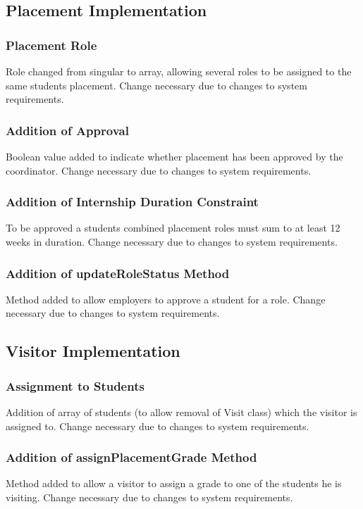 \documentclass{l3deliverable}
\begin{document}
\subsection{Placement Implementation}

\subsubsection{Placement Role}
Role changed from singular to array, allowing several roles to be assigned to the same students placement. Change necessary due to changes to system requirements.

\subsubsection{Addition of Approval}
Boolean value added to indicate whether placement has been approved by the coordinator. Change necessary due to changes to system requirements.

\subsubsection{Addition of Internship Duration Constraint}
To be approved a students combined placement roles must sum to at least 12 weeks in duration. Change necessary due to changes to system requirements.

\subsubsection{Addition of updateRoleStatus Method}
Method added to allow employers to approve a student for a role. Change necessary due to changes to system requirements.

\subsection{Visitor Implementation}

\subsubsection{Assignment to Students}
Addition of array of students (to allow removal of Visit class) which the visitor is assigned to. Change necessary due to changes to system requirements.

\subsubsection{Addition of assignPlacementGrade Method}
Method added to allow a visitor to assign a grade to one of the students he is visiting. Change necessary due to changes to system requirements.
\end{document}
